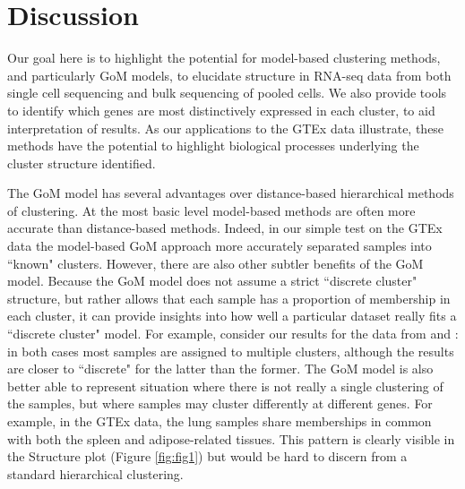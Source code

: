 \section{Discussion}

Our goal here is to highlight the potential for model-based clustering methods, and particularly GoM models, to elucidate
structure in RNA-seq data from both single cell sequencing and bulk sequencing of pooled cells. 
We also provide tools to identify which genes
are most distinctively expressed in each cluster, to aid interpretation of results.
As our applications to the GTEx data illustrate, these methods have the potential to highlight biological processes
underlying the cluster structure identified.

The GoM model has several advantages over distance-based hierarchical methods of clustering. At the most basic level model-based methods are often
more accurate than distance-based methods. Indeed, in our simple test on the GTEx data the model-based GoM approach
more accurately separated samples into ``known" clusters. However, there are also other subtler benefits of the GoM model. Because the GoM 
model does not assume a strict ``discrete cluster" structure, but 
rather allows that each sample has a proportion of membership in each cluster, it can provide insights into how well a 
particular dataset really fits a ``discrete cluster" model. For example, consider our results for the data from \cite{Jaitin2014} and \cite{Deng2014}:
in both cases most samples are assigned to multiple clusters, although the results are closer to ``discrete" for the latter than the former.
The GoM model is also better able to represent situation where there is not really a single clustering of the samples,
but where samples may cluster differently at different genes. For example, in the GTEx data, the lung samples share memberships in common with
both the spleen and adipose-related tissues. This pattern is clearly visible in the Structure plot (Figure \ref{fig:fig1}) but would be hard to 
discern from a standard hierarchical clustering. 

